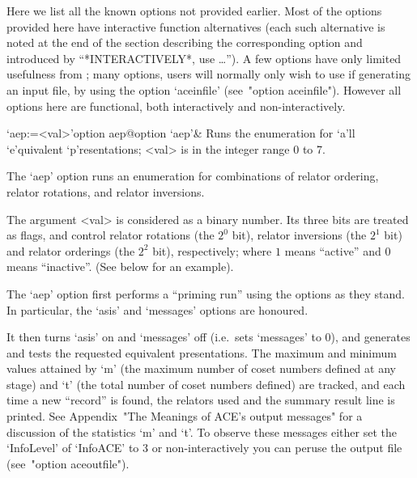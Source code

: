 

Here we list all the known {\ACE} options not provided  earlier.  Most
of the options provided here have  interactive  function  alternatives
(each such alternative is noted at the end of the  section  describing
the corresponding option  and  introduced  by  ``*INTERACTIVELY*,  use
\dots''). A few options have only limited usefulness from {\GAP}; many
options, users will normally only wish to use if generating  an  input
file,  by  using  the  option  `aceinfile'  (see~"option  aceinfile").
However all  options  here  are  functional,  both  interactively  and
non-interactively.


\beginitems

\>`aep:=<val>'{option aep}@{option `aep'}&
Runs the enumeration for `a'll `e'quivalent `p'resentations;
<val> is in the integer range 0 to 7.

The `aep' option runs  an  enumeration  for  combinations  of  relator
ordering, relator rotations, and relator inversions.

The argument <val> is considered as a binary number.  Its  three  bits
are treated as flags, and control relator rotations (the  $2^0$  bit),
relator inversions (the $2^1$ bit) and relator  orderings  (the  $2^2$
bit),  respectively;  where  $1$  means  ``active''  and   $0$   means
``inactive''. (See below for an example).

The `aep' option first performs a ``priming run'' using the options as
they stand. In particular,  the  `asis'  and  `messages'  options  are
honoured.

It then turns `asis' on and `messages' off  (i.e.~sets  `messages'  to
0), and generates and tests the  requested  equivalent  presentations.
The maximum and minimum values attained by `m' (the maximum number  of
coset numbers defined at any stage) and `t' (the total number of coset
numbers defined) are tracked, and each time a new ``record'' is found,
the relators  used  and  the  summary  result  line  is  printed.  See
Appendix~"The Meanings of ACE's output messages" for a  discussion  of
the statistics `m' and `t'. To observe these messages either  set  the
`InfoLevel' of `InfoACE' to 3 or non-interactively you can peruse  the
{\ACE} output file (see~"option aceoutfile").

